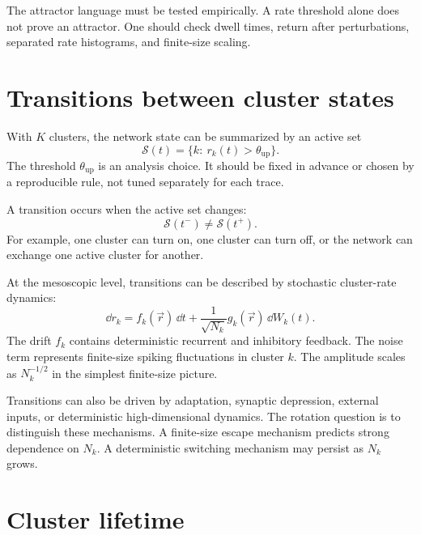 The attractor language must be tested empirically. A rate threshold alone does not prove an attractor. One should check dwell times, return after perturbations, separated rate histograms, and finite-size scaling.

\section{Transitions between cluster states}
\label{sec:transitions-between-cluster-states}

With $K$ clusters, the network state can be summarized by an active set
%
\begin{equation}
  \mathcal{S}(t)
  =
  \{k:\ r_k(t)>\theta_{\mathrm{up}}\}.
  \label{eq:active-set-ch05}
\end{equation}
%
The threshold $\theta_{\mathrm{up}}$ is an analysis choice. It should be fixed in advance or chosen by a reproducible rule, not tuned separately for each trace.

A transition occurs when the active set changes:
%
\begin{equation}
  \mathcal{S}(t^-)\neq \mathcal{S}(t^+).
  \label{eq:active-set-transition}
\end{equation}
%
For example, one cluster can turn on, one cluster can turn off, or the network can exchange one active cluster for another.

At the mesoscopic level, transitions can be described by stochastic cluster-rate dynamics:
%
\begin{equation}
  \dd r_k
  =
  f_k(\vec r)\,\dd t
  +
  \frac{1}{\sqrt{N_k}}g_k(\vec r)\,\dd W_k(t).
  \label{eq:cluster-transition-langevin-ch05}
\end{equation}
%
The drift $f_k$ contains deterministic recurrent and inhibitory feedback. The noise term represents finite-size spiking fluctuations in cluster $k$. The amplitude scales as $N_k^{-1/2}$ in the simplest finite-size picture.

Transitions can also be driven by adaptation, synaptic depression, external inputs, or deterministic high-dimensional dynamics. The rotation question is to distinguish these mechanisms. A finite-size escape mechanism predicts strong dependence on $N_k$. A deterministic switching mechanism may persist as $N_k$ grows.

\section{Cluster lifetime}
\label{sec:cluster-lifetime}

